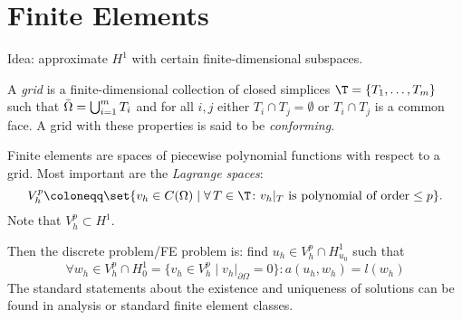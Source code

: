 \section{Finite Elements}
Idea: approximate $H^1$ with certain finite-dimensional subspaces.
\begin{definition}
	A \textit{grid} is a finite-dimensional collection of closed simplices $\T=\{ T_1,\ldots, T_m\}$ such that $\bar{\Omega}=\bigcup_{i=1}^mT_i$ and for all $i,j$ either $T_i\cap T_j=\emptyset$ or $T_i\cap T_j$ is a common face. A grid with these properties is said to be \textit{conforming}.
\end{definition}
Finite elements are spaces of piecewise polynomial functions with respect to a grid. Most important are the \textit{Lagrange spaces}:
\begin{equation*}
  V_h^p \coloneqq \set {v_h\in C(\Omega)\mid\forall\, T\in\T\colon v_h|_T\text{ is polynomial of order}\leq p}.
\end{equation*}
Note that $V_h^p\subset H^1$.

Then the discrete problem/FE problem is: find $u_h\in V_h^p\cap H^1_{u_0}$ such that
\begin{equation*}
	\forall w_h\in V_h^p\cap H_0^1=\{ v_h\in V_h^p\mid v_h|_{\partial\Omega}=0\}\colon a(u_h,w_h)=l(w_h)
\end{equation*}
The standard statements about the existence and uniqueness of solutions can be found in analysis or standard finite element classes.
